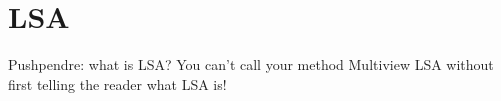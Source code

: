 \section{LSA}

Pushpendre: what is LSA?  You can't call your method Multiview LSA
without first telling the reader what LSA is!

